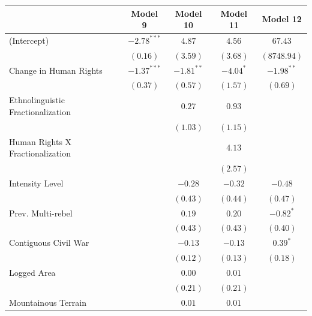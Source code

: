 \documentclass[12pt,]{book}
\let\origtable\table
\let\endorigtable\endtable
\renewenvironment{table}[1][2] {
    \singlespacing
    \expandafter\origtable\expandafter[H]
} {
    \endorigtable
}
\theoremstyle{definition}
\theoremstyle{definition}
\theoremstyle{definition}
\theoremstyle{remark}
\begin{document}
\begin{table}
\begin{center}
\begin{tabular}{l c c c c }
\hline
 & Model 9 & Model 10 & Model 11 & Model 12 \\
\hline
(Intercept)                       & $-2.78^{***}$ & $4.87$       & $4.56$      & $67.43$      \\
                                  & $(0.16)$      & $(3.59)$     & $(3.68)$    & $(8748.94)$  \\
Change in Human Rights            & $-1.37^{***}$ & $-1.81^{**}$ & $-4.04^{*}$ & $-1.98^{**}$ \\
                                  & $(0.37)$      & $(0.57)$     & $(1.57)$    & $(0.69)$     \\
Ethnolinguistic Fractionalization &               & $0.27$       & $0.93$      &              \\
                                  &               & $(1.03)$     & $(1.15)$    &              \\
Human Rights X Fractionalization  &               &              & $4.13$      &              \\
                                  &               &              & $(2.57)$    &              \\
Intensity Level                   &               & $-0.28$      & $-0.32$     & $-0.48$      \\
                                  &               & $(0.43)$     & $(0.44)$    & $(0.47)$     \\
Prev. Multi-rebel                 &               & $0.19$       & $0.20$      & $-0.82^{*}$  \\
                                  &               & $(0.43)$     & $(0.43)$    & $(0.40)$     \\
Contiguous Civil War              &               & $-0.13$      & $-0.13$     & $0.39^{*}$   \\
                                  &               & $(0.12)$     & $(0.13)$    & $(0.18)$     \\
Logged Area                       &               & $0.00$       & $0.01$      &              \\
                                  &               & $(0.21)$     & $(0.21)$    &              \\
Mountainous Terrain               &               & $0.01$       & $0.01$      &              \\

\end{tabular}
\end{center}
\end{table}
\end{document}
